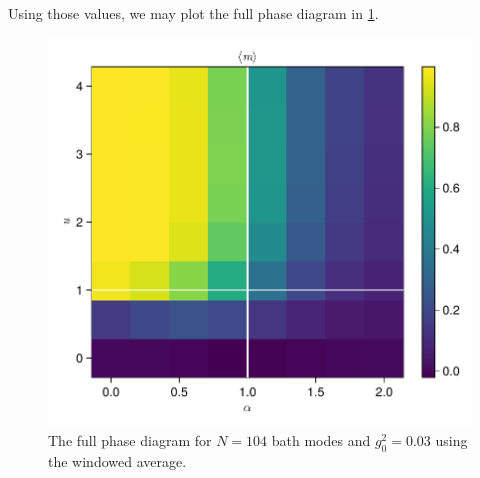 \documentclass[fontsize=10pt,paper=b5,open=any,
twoside=no,toc=listof,toc=bibliography,headings=optiontohead,
captions=nooneline,captions=tableabove,english,DIV=15,numbers=noenddot,final,parskip=half-,
headinclude=true,footinclude=false,BCOR=0mm]{scrartcl}
\begin{document}
Using those values, we may plot the full phase diagram in \cref{fig:example_full_diag}.
\begin{figure}[H]
  \centering
  \includegraphics[width=\linewidth]{plots/example_full_diag}
  \caption{\label{fig:example_full_diag} The full phase diagram for
    \(N=104\) bath modes and \(g_{0}^{2}=0.03\) using the windowed
    average.}
\end{figure}

\printbibliography{}
\printacronyms{}
\end{document}
